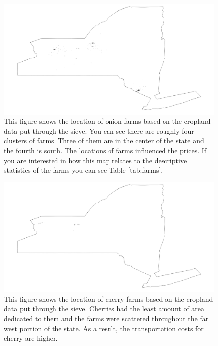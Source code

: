 \documentclass{report}
\begin{document}

\begin{figure}
\centering
\begin{framed}
\includegraphics[scale=.50]{farms_49}
\caption{This figure shows the location of onion farms based on the cropland data put through the sieve. You can see there are roughly four clusters of farms. Three of them are in the center of the state and the fourth is south. The locations of farms influenced the prices. If you are interested in how this map relates to the descriptive statistics of the farms you can see Table \ref{tab:farms}.}
\label{fig:farms_49}
\end{framed}
\end{figure}

\begin{figure}
\centering
\begin{framed}
\includegraphics[scale=.50]{farms_66}
\caption{This figure shows the location of cherry farms based on the cropland data put through the sieve. Cherries had the least amount of area dedicated to them and the farms were scattered throughout the far west portion of the state. As a result, the transportation costs for cherry are higher.}
\label{fig:farms_66}
\end{framed}
\end{figure}
\end{document}
